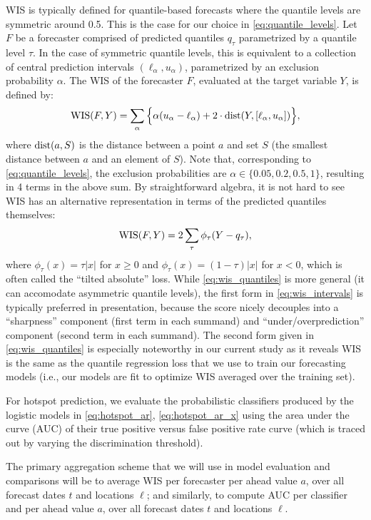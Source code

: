 \documentclass[9pt,twocolumn,twoside,lineno]{pnas-new}
\begin{document}
WIS is typically defined for quantile-based forecasts where the quantile levels
are symmetric around 0.5.  This is the case for our choice in
\eqref{eq:quantile_levels}.  Let $F$ be a forecaster comprised of predicted
quantiles $q_\tau$ parametrized by a quantile level $\tau$.  In the case of
symmetric quantile levels, this is equivalent to a collection of central
prediction intervals $(\ell_\alpha, u_\alpha)$, parametrized by an exclusion
probability $\alpha$. The WIS of the forecaster $F$, evaluated at the target
variable $Y$, is defined by:
\begin{equation}
\label{eq:wis_intervals}
\mathrm{WIS}(F,Y) = \sum_\alpha \Big\{\alpha(u_\alpha - \ell_\alpha) + 2 \cdot
\mathrm{dist}(Y, [\ell_\alpha, u_\alpha])\Big\},  
\end{equation}
where $\mathrm{dist}(a, S)$ is the distance between a point $a$ and set $S$ (the
smallest distance between $a$ and an element of $S$).  Note that, corresponding 
to \eqref{eq:quantile_levels}, the exclusion probabilities are $\alpha \in
\{0.05, 0.2, 0.5, 1\}$, resulting in 4 terms in the above sum.  By 
straightforward algebra, it is not hard to see WIS has an alternative 
representation in terms of the predicted quantiles themselves:
\begin{equation}
\label{eq:wis_quantiles}
\mathrm{WIS}(F,Y) = 2 \sum_\tau \phi_\tau(Y - q_\tau), 
\end{equation}
where $\phi_\tau(x) = \tau |x|$ for $x \geq 0$ and $\phi_\tau(x) = (1-\tau)
|x|$ for $x<0$, which is often called the ``tilted absolute'' loss.  While
\eqref{eq:wis_quantiles} is more general (it can accomodate asymmetric quantile
levels), the first form in \eqref{eq:wis_intervals} is typically preferred in
presentation, because the score nicely decouples into a ``sharpness'' component
(first term in each summand) and ``under/overprediction'' component (second term
in each summand).  The second form given in \eqref{eq:wis_quantiles} is
especially noteworthy in our current study as it reveals WIS is the same as the
quantile regression loss that we use to train our forecasting models (i.e., our
models are fit to optimize WIS averaged over the training set).

For hotspot prediction, we evaluate the probabilistic classifiers produced by
the logistic models in \eqref{eq:hotspot_ar}, \eqref{eq:hotspot_ar_x} using the 
area under the curve (AUC) of their true positive versus false positive rate
curve (which is traced out by varying the discrimination threshold). 

The primary aggregation scheme that we will use in model evaluation and
comparisons will be to average WIS per forecaster per ahead value $a$, over all
forecast dates $t$ and locations $\ell$; and similarly, to compute AUC per
classifier and per ahead value $a$, over all forecast dates $t$ and locations
$\ell$.
\end{document}
